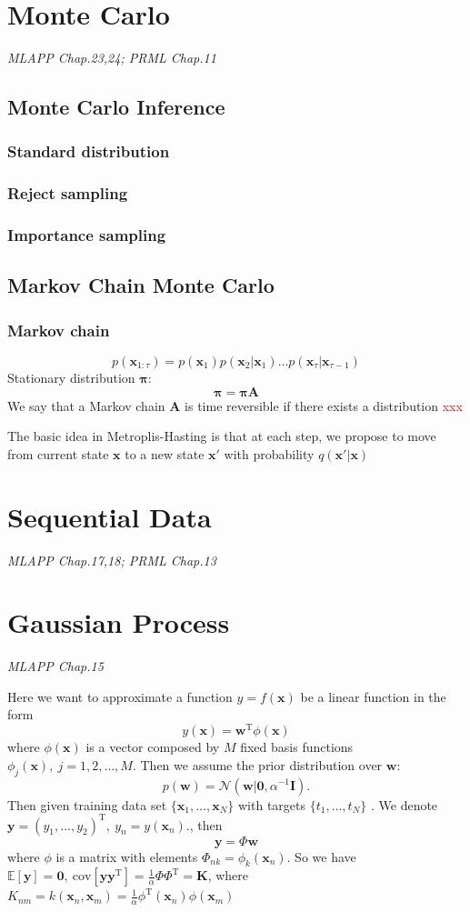 \documentclass{article}
\newcommand{\ppi}{\bm{\pi}}
\newcommand{\normD}{\mathcal{N}}
\newcommand{\mrm}{\mathrm}
\newcommand{\mbf}{\mathbf}
\newcommand{\KK}{\mbf K}
\newcommand{\ww}{\mbf w}
\newcommand{\xx}{\mbf x}
\newcommand{\yy}{\mbf y}
\newcommand{\bmz}{\bm{0}}
\newcommand{\Exp}{\mathbb{E}}
\newcommand{\rev}{^{-1}}
\newcommand{\trans}{^{\mrm T}}
\newcommand{\subsub}{\subsubsection*}
\begin{document}
\section{Monte Carlo}
\emph{MLAPP Chap.23,24; PRML Chap.11}
\subsection{Monte Carlo Inference}
\subsubsection*{Standard distribution}
\subsub{Reject sampling}
\subsub{Importance sampling}
\subsection{Markov Chain Monte Carlo}
\subsub{Markov chain}
\begin{equation}
    p(\xx_{1:\tau}) = p(\xx_1)p(\xx_2|\xx_1)\dots p(\xx_\tau|\xx_{\tau-1})
\end{equation}
Stationary distribution $\bm{\pi}$:
\begin{equation}
    \ppi = \ppi\mbf A
\end{equation}
We say that a Markov chain $\mbf A$ is time reversible if there exists a distribution 
\textcolor{red}{xxx}

The basic idea in Metroplis-Hasting is that at each step, we propose to move from current state $\xx$ to a new state $\xx'$ with probability $q(\xx'|\xx)$ 

\section{Sequential Data}
\emph{MLAPP Chap.17,18; PRML Chap.13}

\section{Gaussian Process}
\emph{MLAPP Chap.15}

Here we want to approximate a function $y= f(\xx)$ be a linear function in the form 
\begin{equation}
    y(\xx) = \ww\trans\phi(\xx)
\end{equation}
where $\phi(\xx)$ is a vector composed by $M$ fixed basis functions $\phi_j(\xx),\ j=1,2,\dots,M$. Then we assume the prior distribution over $\ww$:
\begin{equation}
    p(\ww) = \normD(\ww|\bmz, \alpha\rev\mbf I).
\end{equation}
Then given training data set $\{\xx_1, \dots, \xx_N\}$ with targets $\{t_1,\dots, t_N\}$ . We denote $\yy = (y_1,\dots, y_2)\trans,\ y_n=y(\xx_n).$, then 
\begin{equation}
    \yy =  \Phi\ww
\end{equation}
where $\phi$ is a matrix with elements $\Phi_{nk}=\phi_k(\xx_n)$. So we have $\Exp[\yy]=\bmz,\ \mrm{cov}[\yy\yy\trans] = \frac{1}{\alpha}\Phi\Phi\trans=\KK$, where $K_{nm}=k(\xx_n,\xx_m)=\frac{1}{\alpha}\phi\trans(\xx_n)\phi(\xx_m)$
\end{document}
